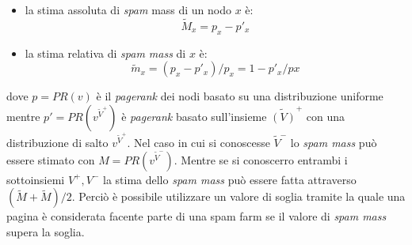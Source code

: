 \begin{itemize}
 \item la stima assoluta di \textit{spam} mass di un nodo \(x\) è:
 \begin{equation}
 \tilde{M}_x=p_x-p'_x
\end{equation}
\item la stima relativa di \textit{spam mass} di \(x\) è:
 \begin{equation}
 \tilde{m}_x=(p_x-p'_x)/p_x=1-p'_x/px
\end{equation}
\end{itemize}
dove \(p=PR(v)\) è il \textit{pagerank} dei nodi basato su una distribuzione uniforme mentre \(p'=PR(v^{\tilde{V}^+})\) è \textit{pagerank} basato sull'insieme \(\tilde{(V)}^+\)  con una distribuzione di salto \(v^{\tilde{V}^+}\). Nel caso in cui si conoscesse \(\tilde{V}^-\) lo \textit{spam mass} può essere stimato con \(M=PR(v^{\tilde{V}^-})\). Mentre se si conoscerro entrambi i sottoinsiemi \(V^+, V^-\) la stima dello \textit{spam mass} può essere fatta attraverso \((\tilde{M}+\tilde{M})/2\). Perciò è possibile utilizzare un valore di soglia tramite la quale una pagina è considerata facente parte di una spam farm se il valore di \textit{spam mass} supera la soglia.

